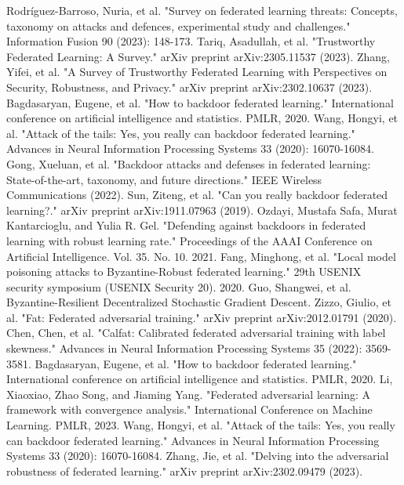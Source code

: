 \documentclass[conference]{IEEEtran}
\begin{document}
\begin{thebibliography}{00}
     Rodríguez-Barroso, Nuria, et al. "Survey on federated learning threats: Concepts, taxonomy on attacks and defences, experimental study and challenges." Information Fusion 90 (2023): 148-173.
     Tariq, Asadullah, et al. "Trustworthy Federated Learning: A Survey." arXiv preprint arXiv:2305.11537 (2023).
     Zhang, Yifei, et al. "A Survey of Trustworthy Federated Learning with Perspectives on Security, Robustness, and Privacy." arXiv preprint arXiv:2302.10637 (2023).
     Bagdasaryan, Eugene, et al. "How to backdoor federated learning." International conference on artificial intelligence and statistics. PMLR, 2020.
     Wang, Hongyi, et al. "Attack of the tails: Yes, you really can backdoor federated learning." Advances in Neural Information Processing Systems 33 (2020): 16070-16084.
     Gong, Xueluan, et al. "Backdoor attacks and defenses in federated learning: State-of-the-art, taxonomy, and future directions." IEEE Wireless Communications (2022).
     Sun, Ziteng, et al. "Can you really backdoor federated learning?." arXiv preprint arXiv:1911.07963 (2019).
     Ozdayi, Mustafa Safa, Murat Kantarcioglu, and Yulia R. Gel. "Defending against backdoors in federated learning with robust learning rate." Proceedings of the AAAI Conference on Artificial Intelligence. Vol. 35. No. 10. 2021.
     Fang, Minghong, et al. "Local model poisoning attacks to {Byzantine-Robust} federated learning." 29th USENIX security symposium (USENIX Security 20). 2020.
     Guo, Shangwei, et al. Byzantine-Resilient Decentralized Stochastic Gradient Descent.
     Zizzo, Giulio, et al. "Fat: Federated adversarial training." arXiv preprint arXiv:2012.01791 (2020).
     Chen, Chen, et al. "Calfat: Calibrated federated adversarial training with label skewness." Advances in Neural Information Processing Systems 35 (2022): 3569-3581.
     Bagdasaryan, Eugene, et al. "How to backdoor federated learning." International conference on artificial intelligence and statistics. PMLR, 2020.
     Li, Xiaoxiao, Zhao Song, and Jiaming Yang. "Federated adversarial learning: A framework with convergence analysis." International Conference on Machine Learning. PMLR, 2023.
     Wang, Hongyi, et al. "Attack of the tails: Yes, you really can backdoor federated learning." Advances in Neural Information Processing Systems 33 (2020): 16070-16084.
     Zhang, Jie, et al. "Delving into the adversarial robustness of federated learning." arXiv preprint arXiv:2302.09479 (2023).

\end{thebibliography}
\end{document}
